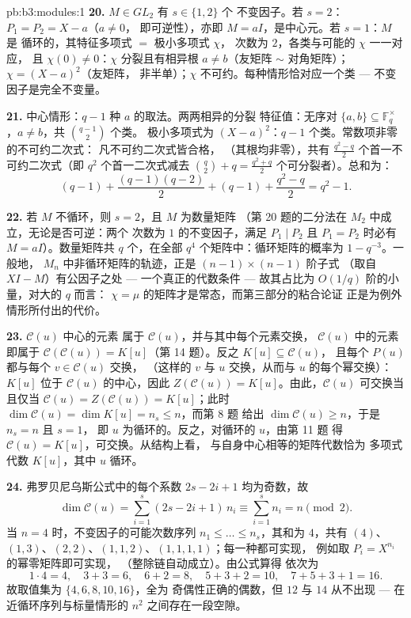 \begin{solution}{pb:b3:modules:1}
\textbf{20.} $M \in GL_2$ 有 $s \in \{1, 2\}$ 个
不变因子。若 $s = 2$：$P_1 = P_2 = X - a$（$a \neq 0$，
即可逆性），亦即 $M = aI$，是中心元。若 $s = 1$：$M$ 是
循环的，其特征多项式 $=$ 极小多项式 $\chi$，
次数为 $2$，各类与可能的 $\chi$ 一一对应，
且 $\chi(0) \neq 0$：$\chi$ 分裂且有相异根 $a \neq
b$（友矩阵 $\sim$ 对角矩阵）；$\chi = (X - a)^2$（友矩阵，
非半单）；$\chi$ 不可约。每种情形恰对应一个类 ---
不变因子是完全不变量。

\textbf{21.} 中心情形：$q - 1$ 种 $a$ 的取法。两两相异的分裂
特征值：无序对 $\{a, b\} \subseteq
\mathbb F_q^\times$，$a \neq b$，共 $\binom{q-1}2$ 个类。
极小多项式为 $(X-a)^2$：$q - 1$ 个类。常数项非零的不可约二次式：
凡不可约二次式皆合格，
（其根均非零），共有 $\frac{q^2 - q}2$
个首一不可约二次式（即 $q^2$ 个首一二次式减去
$\binom q2 + q = \frac{q^2+q}2$ 个可分裂者）。总和为：
\[
(q - 1) + \frac{(q-1)(q-2)}2 + (q - 1) + \frac{q^2 - q}2
= q^2 - 1 .
\]

\textbf{22.} 若 $M$ 不循环，则 $s = 2$，且 $M$ 为数量矩阵
（第 20 题的二分法在 $M_2$ 中成立，无论是否可逆：两个
次数为 $1$ 的不变因子，满足 $P_1 \mid P_2$ 且 $P_1 =
P_2$ 时必有 $M = aI$）。数量矩阵共 $q$ 个，在全部 $q^4$
个矩阵中：循环矩阵的概率为 $1 - q^{-3}$。一般地，
$M_n$ 中非循环矩阵的轨迹，正是 $(n-1)\times(n-1)$ 阶子式
（取自 $XI - M$）有公因子之处 --- 一个真正的代数条件
--- 故其占比为 $O(1/q)$ 阶的小量，对大的 $q$ 而言：
$\chi = \mu$ 的矩阵才是常态，而第三部分的粘合论证
正是为例外情形所付出的代价。

\textbf{23.} $\mathcal C(u)$ 中心的元素
属于 $\mathcal C(u)$，并与其中每个元素交换，
$\mathcal C(u)$ 中的元素即属于 $\mathcal C(\mathcal C(u)) =
K[u]$（第 14 题）。反之 $K[u] \subseteq \mathcal C(u)$，
且每个 $P(u)$ 都与每个 $v \in \mathcal C(u)$ 交换，
（这样的 $v$ 与 $u$ 交换，从而与 $u$ 的每个幂交换）：
$K[u]$ 位于 $\mathcal C(u)$ 的中心，因此 $Z(\mathcal C(u))
= K[u]$。由此，$\mathcal C(u)$ 可交换当且仅当
$\mathcal C(u) = Z(\mathcal C(u)) = K[u]$；此时
$\dim\mathcal C(u) = \dim K[u] = n_s \leq n$，而第 8 题
给出 $\dim\mathcal C(u) \geq n$，于是 $n_s = n$ 且 $s = 1$，
即 $u$ 为循环的。反之，对循环的 $u$，由第 11 题
得 $\mathcal C(u) = K[u]$，可交换。从结构上看，
与自身中心相等的矩阵代数恰为
多项式代数 $K[u]$，其中 $u$ 循环。

\textbf{24.} 弗罗贝尼乌斯公式中的每个系数 $2s - 2i + 1$
均为奇数，故
\[
\dim\mathcal C(u) = \sum_{i=1}^s(2s - 2i + 1)\,n_i
\equiv \sum_{i=1}^s n_i = n \pmod 2 .
\]
当 $n = 4$ 时，不变因子的可能次数序列 $n_1 \leq \dots
\leq n_s$，其和为 $4$，共有
$(4)$、$(1, 3)$、$(2, 2)$、$(1, 1, 2)$、$(1, 1, 1, 1)$；每一种都可实现，
例如取 $P_i = X^{n_i}$ 的幂零矩阵即可实现，
（整除链自动成立）。由公式算得
依次为
\[
1\cdot4 = 4, \quad 3 + 3 = 6, \quad 6 + 2 = 8, \quad
5 + 3 + 2 = 10, \quad 7 + 5 + 3 + 1 = 16 .
\]
故取值集为 $\{4, 6, 8, 10, 16\}$，全为
奇偶性正确的偶数，但 $12$ 与 $14$ 从不出现 --- 在
近循环序列与标量情形的 $n^2$ 之间存在一段空隙。


\end{solution}
